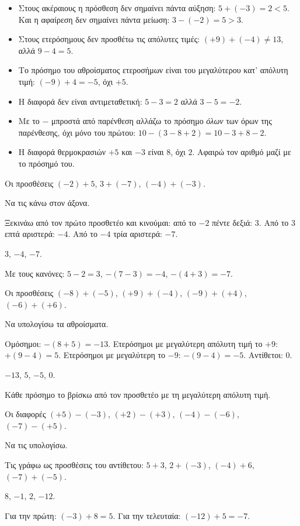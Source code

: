 \begin{prosoxi}
\begin{itemize}[leftmargin=1.2em,itemsep=0.3ex,topsep=2pt]
\item Στους ακέραιους η πρόσθεση δεν σημαίνει πάντα αύξηση: $5+(-3)=2<5$. Και η αφαίρεση δεν σημαίνει πάντα μείωση: $3-(-2)=5>3$.
\item Στους ετερόσημους δεν προσθέτω τις απόλυτες τιμές: $(+9)+(-4)\neq13$, αλλά $9-4=5$.
\item Το πρόσημο του αθροίσματος ετεροσήμων είναι του μεγαλύτερου κατ' απόλυτη τιμή: $(-9)+4=-5$, όχι $+5$.
\item Η διαφορά δεν είναι αντιμεταθετική: $5-3=2$ αλλά $3-5=-2$.
\item Με το $-$ μπροστά από παρένθεση αλλάζω το πρόσημο \emph{όλων} των όρων της παρένθεσης, όχι μόνο του πρώτου: $10-(3-8+2)=10-3+8-2$.
\item Η διαφορά θερμοκρασιών $+5$ και $-3$ είναι $8$, όχι $2$. Αφαιρώ τον αριθμό μαζί με το πρόσημό του.
\end{itemize}
\end{prosoxi}


\tixero Οι προσθέσεις $(-2)+5$, $3+(-7)$, $(-4)+(-3)$.\par
\tithelo Να τις κάνω στον άξονα.\par
\possindeo Ξεκινάω από τον πρώτο προσθετέο και κινούμαι: από το $-2$ πέντε δεξιά: $3$. Από το $3$ επτά αριστερά: $-4$. Από το $-4$ τρία αριστερά: $-7$.\par
\apantisi $3$, $-4$, $-7$.\par
\elegxos Με τους κανόνες: $5-2=3$, $-(7-3)=-4$, $-(4+3)=-7$.

\tixero Οι προσθέσεις $(-8)+(-5)$, $(+9)+(-4)$, $(-9)+(+4)$, $(-6)+(+6)$.\par
\tithelo Να υπολογίσω τα αθροίσματα.\par
\possindeo Ομόσημοι: $-(8+5)=-13$. Ετερόσημοι με μεγαλύτερη απόλυτη τιμή το $+9$: $+(9-4)=5$. Ετερόσημοι με μεγαλύτερη το $-9$: $-(9-4)=-5$. Αντίθετοι: $0$.\par
\apantisi $-13$, $5$, $-5$, $0$.\par
\elegxos Κάθε πρόσημο το βρίσκω από τον προσθετέο με τη μεγαλύτερη απόλυτη τιμή.

\tixero Οι διαφορές $(+5)-(-3)$, $(+2)-(+3)$, $(-4)-(-6)$, $(-7)-(+5)$.\par
\tithelo Να τις υπολογίσω.\par
\possindeo Τις γράφω ως προσθέσεις του αντίθετου: $5+3$, $2+(-3)$, $(-4)+6$, $(-7)+(-5)$.\par
\apantisi $8$, $-1$, $2$, $-12$.\par
\elegxos Για την πρώτη: $(-3)+8=5$. Για την τελευταία: $(-12)+5=-7$.

